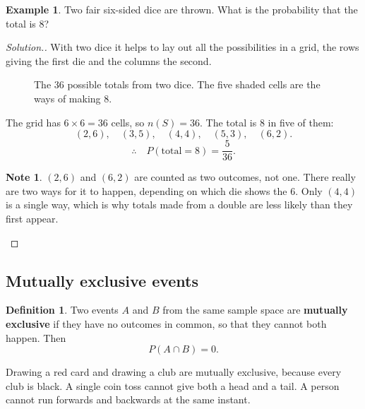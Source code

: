 \documentclass[11pt,a4paper]{article}
\theoremstyle{definition}
\newtheorem{definition}[thm]{Definition}
\newtheorem{example}[thm]{Example}
\newtheorem{note}[thm]{Note}
\newenvironment{solution}
  {\renewcommand{\qedsymbol}{}\begin{proof}[\textit{Solution}.]}
  {\end{proof}}
\begin{document}
\begin{example}
Two fair six-sided dice are thrown. What is the probability that the total is $8$?
\end{example}

\begin{solution}
With two dice it helps to lay out all the possibilities in a grid, the rows giving the
first die and the columns the second.

\begin{figure}[H]
\centering
{}
\caption{The 36 possible totals from two dice. The five shaded cells are the ways of making 8.}
\end{figure}

The grid has $6\times 6=36$ cells, so $n(S)=36$. The total is $8$ in five of them:
$$(2,6),\quad (3,5),\quad (4,4),\quad (5,3),\quad (6,2).$$
$$\therefore\quad P(\text{total}=8)=\frac{5}{36}.$$

\begin{note}
$(2,6)$ and $(6,2)$ are counted as two outcomes, not one. There really are two ways for
it to happen, depending on which die shows the $6$. Only $(4,4)$ is a single way, which
is why totals made from a double are less likely than they first appear.
\end{note}
\end{solution}

\subsection{Mutually exclusive events}

\begin{definition}
Two events $A$ and $B$ from the same sample space are \textbf{mutually exclusive} if
they have no outcomes in common, so that they cannot both happen. Then
$$P(A\cap B)=0.$$
\end{definition}

Drawing a red card and drawing a club are mutually exclusive, because every club is
black. A single coin toss cannot give both a head and a tail. A person cannot run
forwards and backwards at the same instant.
\end{document}
